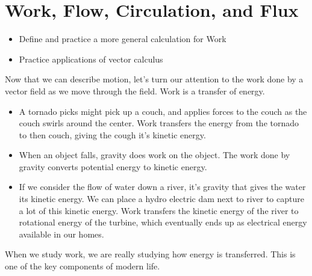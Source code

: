 
\newpage

\section{Work, Flow, Circulation, and Flux}

\begin{itemize}
\item Define and practice a more general calculation for Work
\item Practice applications of vector calculus
\end{itemize}

Now that we can describe motion, let's turn our attention to the work done by a vector field as we move through the field. Work is a transfer of energy. 
\begin{itemize}
 \item A tornado picks might pick up a couch, and applies forces to the couch as the couch swirls around the center. Work transfers the energy from the tornado to then couch, giving the cough it's kinetic energy. 
 \item When an object falls, gravity does work on the object. The work done by gravity converts potential energy to kinetic energy. 
 \item If we consider the flow of water down a river, it's gravity that gives the water its kinetic energy. We can place a hydro electric dam next to river to capture a lot of this kinetic energy.  Work transfers the kinetic energy of the river to rotational energy of the turbine, which eventually ends up as electrical energy available in our homes.  
\end{itemize}
When we study work, we are really studying how energy is transferred. This is one of the key components of modern life.

